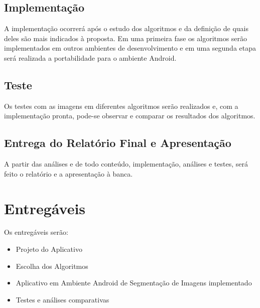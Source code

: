 \subsection{Implementação}
A implementação ocorrerá após o estudo dos algoritmos e da definição de quais deles são mais indicados à proposta. Em uma primeira fase os algoritmos serão implementados em outros ambientes de desenvolvimento e em uma segunda etapa será realizada a portabilidade para o ambiente Android.

\subsection{Teste}
Os testes com as imagens em diferentes algoritmos serão realizados e, com a implementação pronta, pode-se observar e comparar os resultados dos algoritmos.

\subsection{Entrega do Relatório Final e Apresentação}
A partir das análises e de todo conteúdo, implementação, análises e testes, será feito o relatório e a apresentação à banca.


\section{Entregáveis}
Os entregáveis serão:

\begin{itemize}
\item Projeto do  Aplicativo
\item Escolha dos Algoritmos 
\item Aplicativo em Ambiente Android de Segmentação de Imagens implementado
\item Testes e análises comparativas
\end{itemize}


